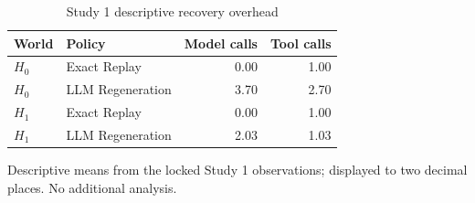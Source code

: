 \begin{table}[!t]
\centering
\caption{Study 1 descriptive recovery overhead}
\label{tab:study1-overhead}
\footnotesize
\begin{tabular}{llrr}
\toprule
World & Policy & Model calls & Tool calls \\
\midrule
$H_0$ & Exact Replay & 0.00 & 1.00 \\
$H_0$ & LLM Regeneration & 3.70 & 2.70 \\
$H_1$ & Exact Replay & 0.00 & 1.00 \\
$H_1$ & LLM Regeneration & 2.03 & 1.03 \\
\bottomrule
\end{tabular}
\par\smallskip\raggedright Descriptive means from the locked Study 1 observations; displayed to two decimal places. No additional analysis.
\end{table}
